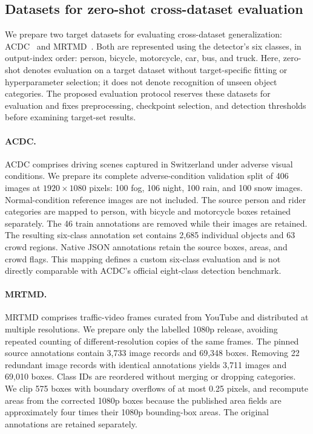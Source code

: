 \subsection{Datasets for zero-shot cross-dataset evaluation}
\label{sec:zero-shot-datasets}

We prepare two target datasets for evaluating cross-dataset generalization:
ACDC~\cite{sakaridis2021acdc,sakaridis2026acdc} and
MRTMD~\cite{bugeja2025mrtmd}. Both are represented using the detector's six
classes, in output-index order: person, bicycle, motorcycle, car, bus, and truck.
Here, zero-shot denotes evaluation on a target dataset without target-specific
fitting or hyperparameter selection; it does not denote recognition of unseen
object categories. The proposed evaluation protocol reserves these datasets
for evaluation and fixes preprocessing, checkpoint selection, and detection
thresholds before examining target-set results.

\paragraph{ACDC.}
ACDC comprises driving scenes captured in Switzerland under adverse visual
conditions. We prepare its complete adverse-condition validation split of
406 images at $1920\times1080$ pixels: 100 fog, 106 night, 100 rain, and 100
snow images. Normal-condition reference images are not included.
The source person and rider categories are mapped to person, with bicycle and
motorcycle boxes retained separately. The 46 train annotations are removed
while their images are retained. The resulting six-class annotation set
contains 2,685 individual objects and 63 crowd regions. Native JSON annotations
retain the source boxes, areas, and crowd flags. This mapping defines a custom
six-class evaluation and is not directly comparable with ACDC's official
eight-class detection benchmark.

\paragraph{MRTMD.}
MRTMD comprises traffic-video frames curated from YouTube and distributed at
multiple resolutions. We prepare only the labelled 1080p release, avoiding
repeated counting of different-resolution copies of the same frames.
The pinned source annotations contain 3,733 image records and 69,348 boxes.
Removing 22 redundant image records with identical annotations yields 3,711
images and 69,010 boxes. Class IDs are reordered without merging or dropping
categories. We clip 575 boxes with boundary overflows of at most 0.25 pixels,
and recompute areas from the corrected 1080p boxes because the published area
fields are approximately four times their 1080p bounding-box areas.
The original annotations are retained separately.

